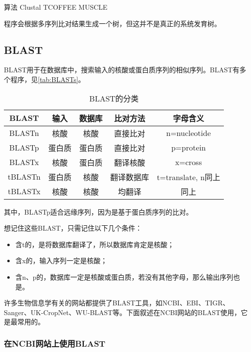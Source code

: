 算法 Clustal TCOFFEE MUSCLE

程序会根据多序列比对结果生成一个树，但这并不是真正的系统发育树。

\subsection{BLAST}

BLAST用于在数据库中，搜索输入的核酸或蛋白质序列的相似序列。BLAST有多个程序，见\autoref{tab:BLASTs}。

\begin{table}[htbp]
	\begin{tabularx}{\textwidth}{|c|c|c|C|C|}
		\hline
		\textbf{BLAST} & \textbf{输入} & \textbf{数据库} & \textbf{比对方法} & \textbf{字母含义} \\ \hline
		BLASTn & 核酸 & 核酸 & 直接比对 & n=nucleotide \\ \hline
		BLASTp & 蛋白质 & 蛋白质 & 直接比对 & p=protein \\ \hline
		BLASTx & 核酸 & 蛋白质 & 翻译核酸 & x=cross \\ \hline
		tBLASTn & 蛋白质 & 核酸 & 翻译数据库 & t=translate, n同上 \\ \hline
		tBLASTx & 核酸 & 核酸 & 均翻译 & 同上 \\ \hline
	\end{tabularx}
	\caption{BLAST的分类}
	\label{tab:BLASTs}
\end{table}

其中，BLASTp适合远缘序列，因为是基于蛋白质序列的比对。

\begin{qj}[：BLAST的种类和比对方法]
	想记住这些BLAST，只需记住以下几个条件：
	\begin{itemize}
		\item 含t的，是将数据库翻译了，所以数据库肯定是核酸；
		\item 含x的，输入序列一定是核酸；
		\item 含n、p的，数据库一定是核酸或蛋白质，若没有其他字母，那么输出序列也是。
	\end{itemize}
\end{qj}

\mbox{}

许多生物信息学有关的网站都提供了BLAST工具，如NCBI、EBI、TIGR、Sanger、UK-CropNet、WU-BLAST等。下面叙述在NCBI网站的BLAST使用，它是最常用的。

\subsubsection{在NCBI网站上使用BLAST}

